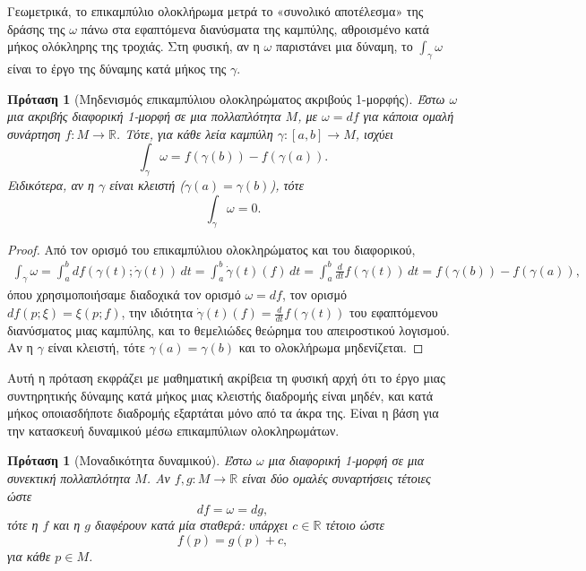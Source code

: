 \documentclass[11pt,a4paper,twoside,openright]{book}
\newtheorem{proposition}[lemma]{Πρόταση}
\begin{document}
Γεωμετρικά, το επικαμπύλιο ολοκλήρωμα μετρά το «συνολικό αποτέλεσμα» της δράσης της $\omega$ πάνω στα εφαπτόμενα διανύσματα της καμπύλης, αθροισμένο κατά μήκος ολόκληρης της τροχιάς. Στη φυσική, αν η $\omega$ παριστάνει μια δύναμη, το $\int_{\gamma} \omega$ είναι το έργο της δύναμης κατά μήκος της $\gamma$.

\begin{proposition}[Μηδενισμός επικαμπύλιου ολοκληρώματος ακριβούς 1-μορφής]
Έστω $\omega$ μια ακριβής διαφορική 1-μορφή σε μια πολλαπλότητα $M$, με $\omega = df$ για κάποια ομαλή συνάρτηση $f: M \to \mathbb{R}$. Τότε, για κάθε λεία καμπύλη $\gamma: [a, b] \to M$, ισχύει
\begin{equation}
\int_{\gamma} \omega = f(\gamma(b)) - f(\gamma(a)).
\end{equation}
Ειδικότερα, αν η $\gamma$ είναι κλειστή ($\gamma(a) = \gamma(b)$), τότε
\begin{equation}
\int_{\gamma} \omega = 0.
\end{equation}
\end{proposition}

\begin{proof}
Από τον ορισμό του επικαμπύλιου ολοκληρώματος και του διαφορικού,
\begin{align*}
\int_{\gamma} \omega = \int_{a}^{b} df(\gamma(t); \dot{\gamma}(t)) \, dt = \int_{a}^{b} \dot{\gamma}(t)(f) \, dt = \int_{a}^{b} \frac{d}{dt} f(\gamma(t)) \, dt = f(\gamma(b)) - f(\gamma(a)),
\end{align*}
όπου χρησιμοποιήσαμε διαδοχικά τον ορισμό $\omega = df$, τον ορισμό $df(p; \xi) = \xi(p; f)$, την ιδιότητα $\dot{\gamma}(t)(f) = \frac{d}{dt} f(\gamma(t))$ του εφαπτόμενου διανύσματος μιας καμπύλης, και το θεμελιώδες θεώρημα του απειροστικού λογισμού. Αν η $\gamma$ είναι κλειστή, τότε $\gamma(a) = \gamma(b)$ και το ολοκλήρωμα μηδενίζεται.
\end{proof}

Αυτή η πρόταση εκφράζει με μαθηματική ακρίβεια τη φυσική αρχή ότι το έργο μιας συντηρητικής δύναμης κατά μήκος μιας κλειστής διαδρομής είναι μηδέν, και κατά μήκος οποιασδήποτε διαδρομής εξαρτάται μόνο από τα άκρα της. Είναι η βάση για την κατασκευή δυναμικού μέσω επικαμπύλιων ολοκληρωμάτων.

\begin{proposition}[Μοναδικότητα δυναμικού]
Έστω $\omega$ μια διαφορική 1-μορφή σε μια συνεκτική πολλαπλότητα $M$. Αν $f, g: M \to \mathbb{R}$ είναι δύο ομαλές συναρτήσεις τέτοιες ώστε
\[
df = \omega = dg,
\]
τότε η $f$ και η $g$ διαφέρουν κατά μία σταθερά: υπάρχει $c \in \mathbb{R}$ τέτοιο ώστε
\[
f(p) = g(p) + c,
\]
για κάθε $p \in M$.
\end{proposition}
\end{document}
